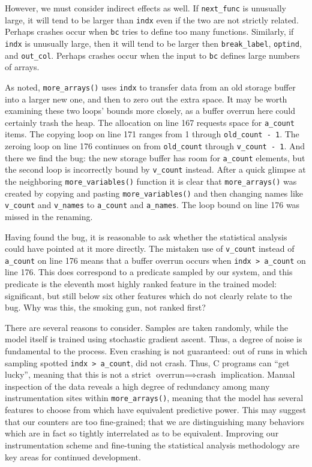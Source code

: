 However, we must consider indirect effects as well.  If
\texttt{next\_func} is unusually large, it will tend to be larger than
\texttt{indx} even if the two are not strictly related.  Perhaps
crashes occur when \texttt{bc} tries to define too many functions.
Similarly, if \texttt{indx} is unusually large, then it will tend to
be larger then \texttt{break\_label}, \texttt{optind}, and
\texttt{out\_col}.  Perhaps crashes occur when the input to
\texttt{bc} defines large numbers of arrays.

As noted, \texttt{more\_arrays()} uses \texttt{indx} to transfer data
from an old storage buffer into a larger new one, and then to zero out
the extra space.  It may be worth examining these two loops' bounds
more closely, as a buffer overrun here could certainly trash the heap.
The allocation on line 167 requests space for \texttt{a\_count} items.
The copying loop on line 171 ranges from 1 through \texttt{old\_count
  - 1}.  The zeroing loop on line 176 continues on from
\texttt{old\_count} through \texttt{v\_count - 1}.  And there we find
the bug: the new storage buffer has room for \texttt{a\_count}
elements, but the second loop is incorrectly bound by
\texttt{v\_count} instead.  After a quick glimpse at the neighboring
\texttt{more\_variables()} function it is clear that
\texttt{more\_arrays()} was created by copying and pasting
\texttt{more\_variables()} and then changing names like
\texttt{v\_count} and \texttt{v\_names} to \texttt{a\_count} and
\texttt{a\_names}.  The loop bound on line 176 was missed in the
renaming.

Having found the bug, it is reasonable to ask whether the statistical
analysis could have pointed at it more directly.  The mistaken use of
\texttt{v\_count} instead of \texttt{a\_count} on line 176 means that
a buffer overrun occurs when \texttt{indx > a\_count} on line 176.
This does correspond to a predicate sampled by our system, and this
predicate is the eleventh most highly ranked feature in the trained
model: significant, but still below six other features which do not
clearly relate to the bug.  Why was this, the smoking gun, not ranked
first?

There are several reasons to consider.  Samples are taken randomly,
while the model itself is trained using stochastic gradient ascent.
Thus, a degree of noise is fundamental to the process.  Even crashing
is not guaranteed: out of \unknown[Alice?] runs in which sampling
spotted \texttt{indx > a\_count}, \unknown[Alice?] did not crash.
Thus, C programs can ``get lucky'', meaning that this is not a strict
$\text{overrun} \implies \text{crash}$ implication.  Manual inspection
of the data reveals a high degree of redundancy among many
instrumentation sites within \texttt{more\_arrays()}, meaning that the
model has several features to choose from which have equivalent
predictive power.  This may suggest that our counters are too
fine-grained; that we are distinguishing many behaviors which are in
fact so tightly interrelated as to be equivalent.  Improving our
instrumentation scheme and fine-tuning the statistical analysis
methodology are key areas for continued development.

